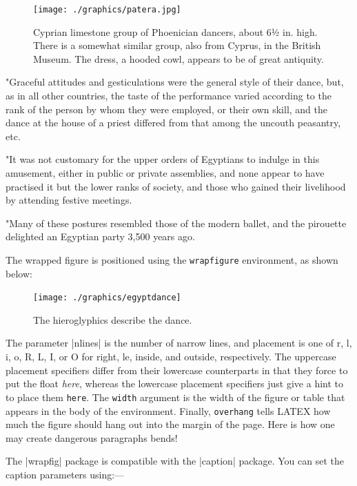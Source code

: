 \begin{figure}
   \texttt{[image: ./graphics/patera.jpg]} 
   \caption{\small Cyprian limestone group of Phoenician dancers, about 6½ in. high. There is a somewhat similar group, also from Cyprus, in the British Museum. The dress, a hooded cowl, appears to be of great antiquity.}
\end{figure}

"Graceful attitudes and gesticulations were the general style of their dance, but, as in all other countries, the taste of the performance varied according to the rank of the person by whom they were employed, or their own skill, and the dance at the house of a priest differed from that among the uncouth peasantry, etc.

"It was not customary for the upper orders of Egyptians to indulge in this amusement, either in public or private assemblies, and none appear to have practised it but the lower ranks of society, and those who gained their livelihood by attending festive meetings.

"Many of these postures resembled those of the modern ballet, and the pirouette delighted an Egyptian party 3,500 years ago.
\medskip

The wrapped figure is positioned using the \texttt{wrapfigure} environment, as shown below:

\begin{teX}
\begin{figure}
   \texttt{[image: ./graphics/egyptdance]} 
   \caption{\small The hieroglyphics describe the dance.}
\end{figure}
\end{teX}

The parameter |nlines|  is the number of narrow lines, and placement is one of r, l, i, o, R, L, I, or
O for right, le, inside, and outside, respectively. The uppercase placement specifiers
differ from their lowercase counterparts in that they force \latex to put the float \emph{here},
whereas the lowercase placement specifiers just give a hint to \latex to place them
\texttt{here}. The \texttt{width} argument is the width of the figure or table that appears in the body
of the environment. Finally, \texttt{overhang} tells LATEX how much the figure should hang out
into the margin of the page. Here is how one may create dangerous paragraphs bends!

The |wrapfig| package is compatible with the |caption| package. You can set the caption parameters using:---

